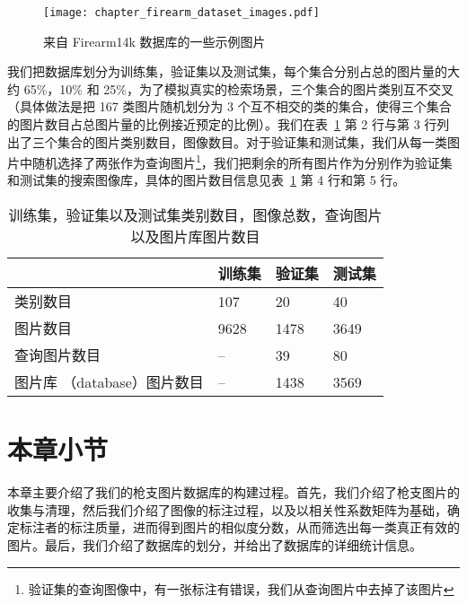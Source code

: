 \begin{figure}[t]
	\centering
	\texttt{[image: chapter\_firearm\_dataset\_images.pdf]}
	\caption{来自 Firearm14k 数据库的一些示例图片}
	\label{fig:dataset_sample_images}
\end{figure}

我们把数据库划分为训练集，验证集以及测试集，每个集合分别占总的图片量的大约 65\%，10\% 和 25\%，为了模拟真实的检索场景，三个集合的图片类别互不交叉 （具体做法是把 167 类图片随机划分为 3 个互不相交的类的集合，使得三个集合的图片数目占总图片量的比例接近预定的比例）。我们在表~\ref{table:train_val_test_stat} 第 2 行与第 3 行列出了三个集合的图片类别数目，图像数目。对于验证集和测试集，我们从每一类图片中随机选择了两张作为查询图片\footnote{验证集的查询图像中，有一张标注有错误，我们从查询图片中去掉了该图片}，我们把剩余的所有图片作为分别作为验证集和测试集的搜索图像库，具体的图片数目信息见表~\ref{table:train_val_test_stat} 第 4 行和第 5 行。

\begin{table}[!t]
	\centering
	\caption{训练集，验证集以及测试集类别数目，图像总数，查询图片以及图片库图片数目}
	\begin{tabular}{@{}llll@{}}
		\toprule
		          & 训练集 & 验证集 & 测试集 \\
		\midrule
		类别数目 & 107       & 20             & 40       \\
		图片数目 & 9628      & 1478           & 3649     \\
		查询图片数目 & --        & 39             & 80       \\
		图片库 （database）图片数目 & -- & 1438 &  3569 \\
		\bottomrule
	\end{tabular}

	\label{table:train_val_test_stat}
\end{table}

\section{本章小节}
本章主要介绍了我们的枪支图片数据库的构建过程。首先，我们介绍了枪支图片的收集与清理，然后我们介绍了图像的标注过程，以及以相关性系数矩阵为基础，确定标注者的标注质量，进而得到图片的相似度分数，从而筛选出每一类真正有效的图片。最后，我们介绍了数据库的划分，并给出了数据库的详细统计信息。
